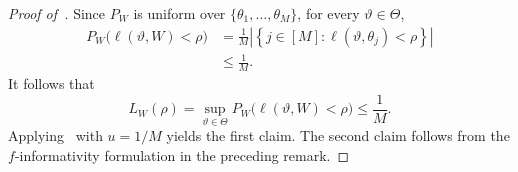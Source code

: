 \documentclass[11pt]{article}
\theoremstyle{definition}
\theoremstyle{remark}
\newcommand{\1}{\boldsymbol{1}}
\begin{document}
\begin{proof}[Proof of~]
Since $P_W$ is uniform over
$\{\theta_1,\ldots,\theta_M\}$, for every $\vartheta\in\Theta$,
\begin{align}
    P_W\bigl(\ell(\vartheta,W)<\rho\bigr)
    &=
    \frac{1}{M}
    \left|
    \left\{
    j\in[M]:
    \ell(\vartheta,\theta_j)<\rho
    \right\}
    \right|\\
    &\leq \frac{1}{M}.
\end{align}
It follows that
\begin{equation}
    L_W(\rho)
    =
    \sup_{\vartheta\in\Theta}
    P_W\bigl(\ell(\vartheta,W)<\rho\bigr)
    \leq \frac{1}{M}.
\end{equation}
Applying~ with
$u=1/M$ yields the first claim. The second claim follows from the
$f$-informativity formulation in the preceding remark.
\end{proof}
\end{document}
